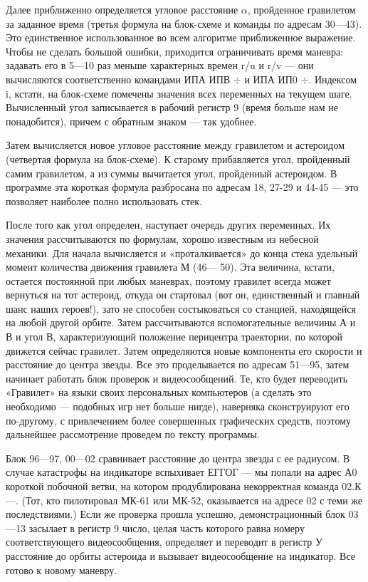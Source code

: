 \documentclass[11pt,a4paper,oneside]{article}
\begin{document}
Далее приближенно определяется угловое расстояние $\alpha$, пройденное гравилетом за заданное время (третья формула на блок-схеме и команды по адресам 30—43). Это единственное использованное во всем алгоритме приближенное выражение. Чтобы не сделать большой ошибки, приходится ограничивать время маневра: задавать его в 5—10 раз меньше характерных времен r/u и r/v — они вычисляются соответственно командами ИПА ИПВ $\div$ и ИПА ИП0 $\div$. Индексом i, кстати, на блок-схеме помечены значения всех переменных на текущем шаге. Вычисленный угол записывается в рабочий регистр 9 (время больше нам не понадобится), причем с обратным знаком — так удобнее.

Затем вычисляется новое угловое расстояние между гравилетом и астероидом (четвертая формула на блок-схеме). К старому прибавляется угол, пройденный самим гравилетом, а из суммы вычитается угол, пройденный астероидом. В программе эта короткая формула разбросана по адресам 18, 27-29 и 44-45 — это позволяет наиболее полно использовать стек.

После того как угол определен, наступает очередь других переменных. Их значения рассчитываются по формулам, хорошо известным из небесной механики. Для начала вычисляется и «проталкивается» до конца стека удельный момент количества движения гравилета М (46— 50). Эта величина, кстати, остается постоянной при любых маневрах, поэтому гравилет всегда может вернуться на тот астероид, откуда он стартовал (вот он, единственный и главный шанс наших героев!), зато не способен состыковаться со станцией, находящейся на любой другой орбите. Затем рассчитываются вспомогательные величины А и В и угол В, характеризующий положение перицентра траектории, по которой движется сейчас гравилет. Затем определяются новые компоненты его скорости и расстояние до центра звезды. Все это проделывается по адресам 51—95, затем начинает работать блок проверок и видеосообщений. Те, кто будет переводить «Гравилет» на языки своих персональных компьютеров (а сделать это необходимо — подобных игр нет больше нигде), наверняка сконструируют его по-другому, с привлечением более совершенных графических средств, поэтому дальнейшее рассмотрение проведем по тексту программы.

Блок 96—97, 00—02 сравнивает расстояние до центра звезды с ее радиусом. В случае катастрофы на индикаторе вспыхивает ЕГГОГ — мы попали на адрес А0 короткой побочной ветви, на котором продублирована некорректная команда 02.К—. (Тот, кто пилотировал МК-61 или МК-52, оказывается на адресе 02 с теми же последствиями.) Если же проверка прошла успешно, демонстрационный блок 03—13 засылает в регистр 9 число, целая часть которого равна номеру соответствующего видеосообщения, определяет и переводит в регистр У расстояние до орбиты астероида и вызывает видеосообщение на индикатор. Все готово к новому маневру.
\end{document}
